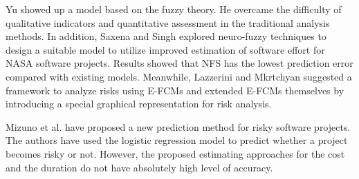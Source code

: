 Yu \cite{yu2011software} showed up a model based on the fuzzy theory. He overcame the difficulty of qualitative indicators and quantitative assessment in the traditional analysis methods. In addition, Saxena and Singh \cite{saxena2012software} explored neuro-fuzzy techniques to design a suitable model to utilize improved estimation of software effort for NASA software projects. Results showed that NFS has the lowest prediction error compared with existing models. Meanwhile, Lazzerini and Mkrtchyan \cite{lazzerini2011analyzing} suggested a framework to analyze risks using E-FCMs and extended E-FCMs themselves by introducing a special graphical representation for risk analysis.

Mizuno et al. \cite{mizuno2001prediction} have proposed a new prediction method for risky software projects. The authors have used the logistic regression model to predict whether a project becomes risky or not. However, the proposed estimating approaches for the cost and the duration do not have absolutely high level of accuracy.

